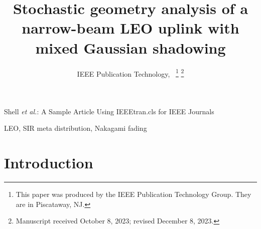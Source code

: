 \documentclass[lettersize,journal]{IEEEtran}
\begin{document}
\title{Stochastic geometry analysis of a narrow-beam LEO uplink with mixed Gaussian shadowing}
\author{IEEE Publication Technology,~
\thanks{This paper was produced by the IEEE Publication Technology Group. They are in Piscataway, NJ.}%
\thanks{Manuscript received October 8, 2023; revised December 8, 2023.}}

%
{Shell \MakeLowercase{\textit{et al.}}: A Sample Article Using IEEEtran.cls for IEEE Journals}



\maketitle
\begin{abstract}
\end{abstract}

\begin{IEEEkeywords}
  LEO, SIR meta distribution, Nakagami fading
\end{IEEEkeywords}


\section{Introduction}
\end{document}
